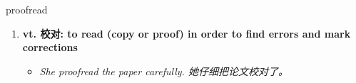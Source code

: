 
\begin{frame}
{\huge proofread}
\begin{center}
\begin{enumerate}\Large
  \item \textbf{vt. 校对: to read (copy or proof) in order to find errors and mark corrections}
  \begin{itemize}
    \item \em{\Large{She proofread the paper carefully. 她仔细把论文校对了。}}
  \end{itemize}
\end{enumerate}
\end{center}
\end{frame}
